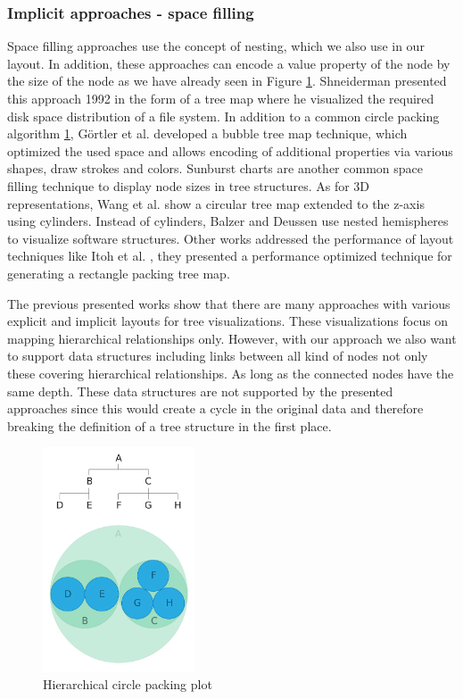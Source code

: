 \subsubsection{Implicit approaches - space filling}
Space filling approaches use the concept of nesting, which we also use in our layout. In addition, these approaches can encode a value property of the node by the size of the node as we have already seen in Figure \ref{fig:hierarchicalCirclePlot}.
Shneiderman \cite{shneiderman_tree_1992} presented this approach 1992 in the form of a tree map where he visualized the required disk space distribution of a file system. In addition to a common circle packing algorithm \ref{fig:hierarchicalCirclePlot}, Görtler et al. \cite{gortler_bubble_2018} developed a bubble tree map technique, which optimized the used space and allows encoding of additional properties via various shapes, draw strokes and colors. Sunburst charts are another common space filling technique to display node sizes in tree structures. 
As for 3D representations, Wang et al. \cite{wang_visualization_2006} show a circular tree map extended to the z-axis using cylinders. Instead of cylinders, Balzer and Deussen \cite{balzer_hierarchy_2004} use nested hemispheres to visualize software structures.
Other works addressed the performance of layout techniques like Itoh et al. \cite{itoh_hierarchical_2004}, they presented a performance optimized technique for generating a rectangle packing tree map.

The previous presented works show that there are many approaches with various explicit and implicit layouts for tree visualizations. These visualizations focus on mapping hierarchical relationships only. 
However, with our approach we also want to support data structures including links between all kind of nodes not only these covering hierarchical relationships. As long as the connected nodes have the same depth. These data structures are not supported by the presented approaches since this would create a cycle in the original data and therefore breaking the definition of a tree structure in the first place.

\begin{figure}[!hbt]
    \centering
    \includegraphics[width=0.40\textwidth, trim={0 0 0 4.3cm},clip]{graphics/circle_packing.pdf}
    \caption{Hierarchical circle packing plot \cite{ribecca_circle_nodate}}
    \label{fig:hierarchicalCirclePlot}
\end{figure}

